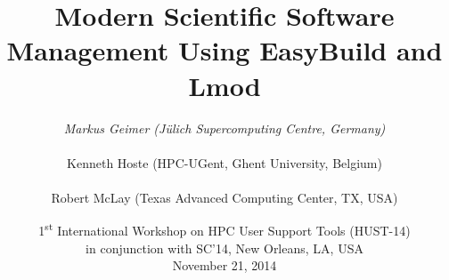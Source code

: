 \documentclass[10pt,xcolor={usenames,dvipsnames}]{beamer}
\begin{document}

\title{\textbf{Modern Scientific Software Management Using EasyBuild and Lmod}}
\author{%
    \textit{Markus Geimer (J{\"u}lich Supercomputing Centre, Germany)}\\~\\
    Kenneth Hoste (HPC-UGent, Ghent University, Belgium)\\~\\
    Robert McLay (Texas Advanced Computing Center, TX, USA)
}
\date{%
    \small%
    1\textsuperscript{st} International Workshop on HPC User Support Tools (HUST-14)\\%
    in conjunction with SC'14, New Orleans, LA, USA\\%
    November 21, 2014%
}

\begin{frame}[noframenumbering]
\titlepage
\end{frame}



\end{document}
